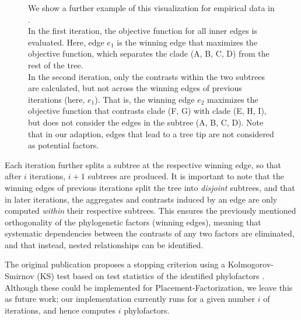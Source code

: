 \begin{figure}[!htbp]
{        We show a further example of this visualization for empirical data in .
        \\
         In the first iteration,
        the objective function for all inner edges is evaluated.
        Here, edge $e_1$ is the winning edge that maximizes the objective function,
        which separates the clade ({\sffamily A}, {\sffamily B}, {\sffamily C}, {\sffamily D}) from the rest of the tree.
        \\
         In the second iteration,
        only the contrasts within the two subtrees %
        are calculated,
        but not across the winning edges of previous iterations (here, $e_1$).
        That is, the winning edge $e_2$ maximizes the objective function that contrasts clade ({\sffamily F}, {\sffamily G})
        with clade ({\sffamily E}, {\sffamily H}, {\sffamily I}),
        but does not consider the edges in the subtree ({\sffamily A}, {\sffamily B}, {\sffamily C}, {\sffamily D}).
        Note that in our adaption, edges that lead to a tree tip are not considered as potential factors.
    }
    \label{fig:phylofactor}
\end{figure}

Each iteration further splits a subtree at the respective winning edge,
so that after $i$ iterations, $i+1$ subtrees are produced.
It is important to note that the winning edges of previous iterations split the tree into \emph{disjoint} subtrees,
and that in later iterations,
the aggregates and contrasts induced by an edge are only computed \emph{within} their respective subtrees.
This ensures the previously mentioned orthogonality of the phylogenetic factors (winning edges),
meaning that systematic dependencies between the contrasts of any two factors are eliminated,
and that instead, nested relationships can be identified.

The original publication proposes a stopping criterion using a Kolmogorov-Smirnov (KS) test \cite{Massey1951}
based on %
test statistics of the identified phylofactors \cite{Washburne2017a,Washburne2019}.
Although these could be implemented for Placement-Factorization, we leave this as future work;
our implementation currently runs for a given number $i$ of iterations, and hence computes $i$ phylofactors.

